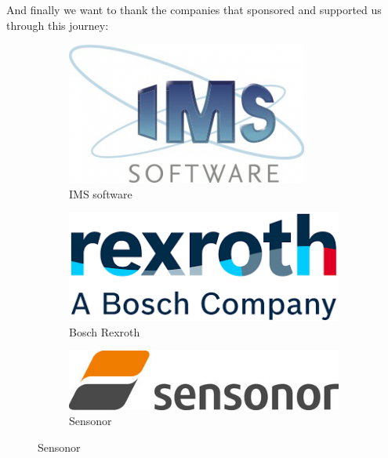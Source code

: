  And finally we want to thank the companies that sponsored and supported us through this journey:
 \begin{figure}[htbp]
 	\centering
 	\begin{subfigure}{0.3\textwidth}
 		\includegraphics[width=1\linewidth]{0-cover/img/ims.png}
 		\caption*{IMS software}
 	\end{subfigure}
 	\begin{subfigure}{0.3\textwidth}
 		\includegraphics[width=1\linewidth]{0-cover/img/bosch.png}
 		\caption*{Bosch Rexroth}
 	\end{subfigure}
 	\begin{subfigure}{0.3\textwidth}
 		\includegraphics[width=1\linewidth]{0-cover/img/Sensonor.jpg}
 		\caption*{Sensonor}
 	\end{subfigure}
\end{figure}
 
